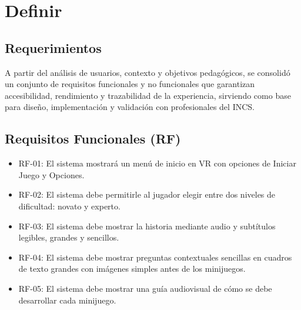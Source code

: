 \section{Definir}
\subsection{Requerimientos}
A partir del análisis de usuarios, contexto y objetivos pedagógicos, se consolidó un conjunto de requisitos funcionales y no funcionales que garantizan accesibilidad, rendimiento y trazabilidad de la experiencia, sirviendo como base para diseño, implementación y validación con profesionales del INCS.%

\subsection{Requisitos Funcionales (RF)} \label{RF}
\begin{itemize}
  \item RF-01: El sistema mostrará un menú de inicio en VR con opciones de Iniciar Juego y Opciones.
  \item RF-02: El sistema debe permitirle al jugador elegir entre dos niveles de dificultad: novato y experto.
  \item RF-03: El sistema debe mostrar la historia mediante audio y subtítulos legibles, grandes y sencillos.
  \item RF-04: El sistema debe mostrar preguntas contextuales sencillas en cuadros de texto grandes con imágenes simples antes de los minijuegos.
  \item RF-05: El sistema debe mostrar una guía audiovisual de cómo se debe desarrollar cada minijuego.
\end{itemize}

